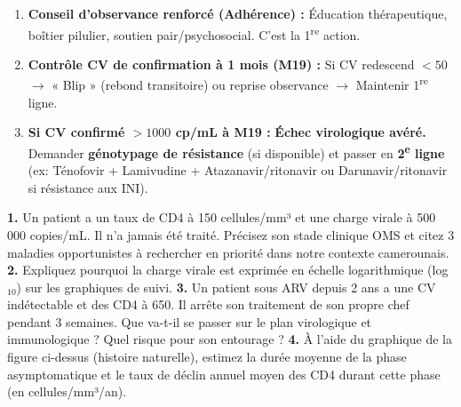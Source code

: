 \documentclass[11pt]{article}
\begin{document}
\begin{exoresolu}
\begin{enumerate}
\begin{itemize}
                \begin{enumerate}
                    \item \textbf{Conseil d'observance renforcé (Adhérence) :} Éducation thérapeutique, boîtier pilulier, soutien pair/psychosocial. C'est la 1\textsuperscript{re} action.
                    \item \textbf{Contrôle CV de confirmation à 1 mois (M19) :} Si CV redescend $< 50$ $\rightarrow$ « Blip » (rebond transitoire) ou reprise observance $\rightarrow$ Maintenir 1\textsuperscript{re} ligne.
                    \item \textbf{Si CV confirmé $> 1000$ cp/mL à M19 :} \textbf{Échec virologique avéré.} Demander \textbf{génotypage de résistance} (si disponible) et passer en \textbf{2\textsuperscript{e} ligne} (ex: Ténofovir + Lamivudine + Atazanavir/ritonavir ou Darunavir/ritonavir si résistance aux INI).
                \end{enumerate}
        \end{itemize}
\end{enumerate}
\end{exoresolu}

\begin{exercice}
\textbf{1.} Un patient a un taux de CD4 à 150 cellules/mm³ et une charge virale à 500 000 copies/mL. Il n'a jamais été traité. Précisez son stade clinique OMS et citez 3 maladies opportunistes à rechercher en priorité dans notre contexte camerounais.
\textbf{2.} Expliquez pourquoi la charge virale est exprimée en échelle logarithmique (log$_{10}$) sur les graphiques de suivi.
\textbf{3.} Un patient sous ARV depuis 2 ans a une CV indétectable et des CD4 à 650. Il arrête son traitement de son propre chef pendant 3 semaines. Que va-t-il se passer sur le plan virologique et immunologique ? Quel risque pour son entourage ?
\textbf{4.} À l'aide du graphique de la figure ci-dessus (histoire naturelle), estimez la durée moyenne de la phase asymptomatique et le taux de déclin annuel moyen des CD4 durant cette phase (en cellules/mm³/an).
\end{exercice}
\end{document}
